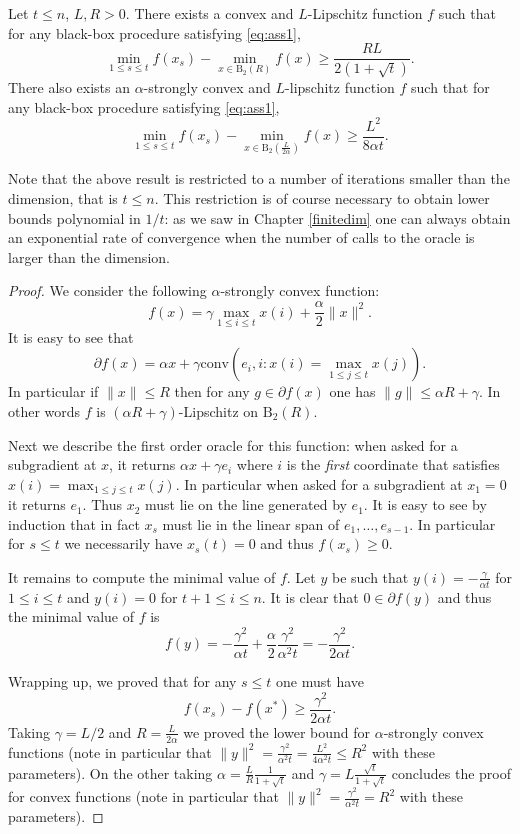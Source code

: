 \documentclass[openany]{now}
\newcommand{\mB}{\mathrm{B}}
\newcommand{\conv}{\mathrm{conv}}
\begin{document}
\begin{theorem} \label{th:lb1}
Let $t \leq n$, $L, R >0$. There exists a convex and $L$-Lipschitz function $f$ such that for any black-box procedure satisfying \eqref{eq:ass1},
$$\min_{1 \leq s \leq t} f(x_s) - \min_{x \in \mB_2(R)} f(x) \geq  \frac{R L}{2 (1 + \sqrt{t})} .$$
There also exists an $\alpha$-strongly convex and $L$-lipschitz function $f$ such that for any black-box procedure satisfying \eqref{eq:ass1},
$$\min_{1 \leq s \leq t} f(x_s) - \min_{x \in \mB_2\left(\frac{L}{2 \alpha}\right)} f(x) \geq  \frac{L^2}{8 \alpha t} .$$
\end{theorem}

Note that the above result is restricted to a number of iterations smaller than the dimension, that is $t \leq n$. This restriction is of course necessary to obtain lower bounds polynomial in $1/t$: as we saw in Chapter \ref{finitedim} one can always obtain an exponential rate of convergence when the number of calls to the oracle is larger than the dimension. 

\begin{proof}
We consider the following $\alpha$-strongly convex function:
$$f(x) = \gamma \max_{1 \leq i \leq t} x(i) + \frac{\alpha}{2} \|x\|^2 .$$
It is easy to see that
$$\partial f(x) = \alpha x + \gamma \conv\left(e_i , i : x(i) = \max_{1 \leq j \leq t} x(j) \right).$$
In particular if $\|x\| \leq R$ then for any $g \in \partial f(x)$ one has $\|g\| \leq \alpha R + \gamma$. In other words $f$ is $(\alpha R + \gamma)$-Lipschitz on $\mB_2(R)$.

Next we describe the first order oracle for this function: when asked for a subgradient at $x$, it returns $\alpha x + \gamma e_{i}$ where $i$ is the {\em first} coordinate that satisfies $x(i) = \max_{1 \leq j \leq t} x(j)$. In particular when asked for a subgradient at $x_1=0$ it returns $e_1$. Thus $x_2$ must lie on the line generated by $e_1$. It is easy to see by induction that in fact $x_s$ must lie in the linear span of $e_1, \hdots, e_{s-1}$. In particular for $s \leq t$ we necessarily have $x_s(t) = 0$ and thus $f(x_s) \geq 0$.

It remains to compute the minimal value of $f$. Let $y$ be such that $y(i) = - \frac{\gamma}{\alpha t}$ for $1 \leq i \leq t$ and $y(i) = 0$ for $t+1 \leq i \leq n$. It is clear that $0 \in \partial f(y)$ and thus the minimal value of $f$ is
$$f(y) = - \frac{\gamma^2}{\alpha t} + \frac{\alpha}{2} \frac{\gamma^2}{\alpha^2 t} = - \frac{\gamma^2}{2 \alpha t} .$$ 

Wrapping up, we proved that for any $s \leq t$ one must have
$$f(x_s) - f(x^*) \geq \frac{\gamma^2}{2 \alpha t} .$$
Taking $\gamma = L/2$ and $R= \frac{L}{2 \alpha}$ we proved the lower bound for $\alpha$-strongly convex functions (note in particular that $\|y\|^2 = \frac{\gamma^2}{\alpha^2 t} = \frac{L^2}{4 \alpha^2 t} \leq R^2$ with these parameters). On the other taking $\alpha = \frac{L}{R} \frac{1}{1 + \sqrt{t}}$ and $\gamma = L \frac{\sqrt{t}}{1 + \sqrt{t}}$ concludes the proof for convex functions (note in particular that $\|y\|^2 = \frac{\gamma^2}{\alpha^2 t} = R^2$ with these parameters).
\end{proof}
\end{document}
